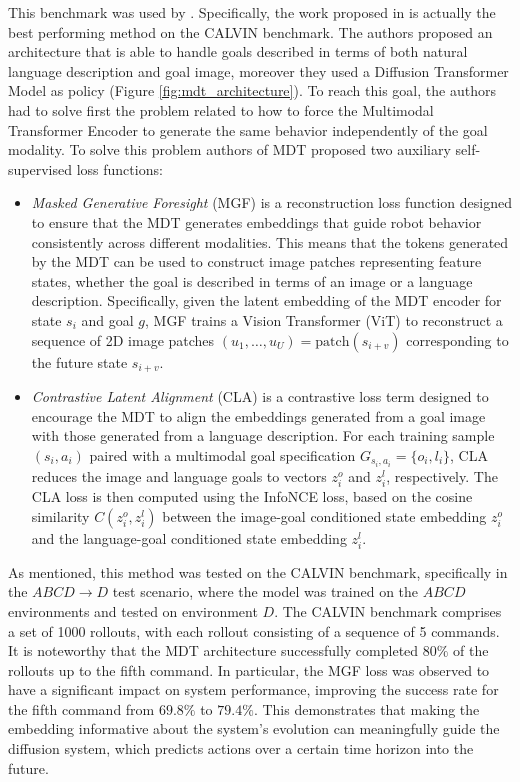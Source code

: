 This benchmark was used by \cite{mees2022hulc,mees2023hulc++,reuss2024multimodal}. Specifically, the work proposed in \cite{reuss2024multimodal} is actually the best performing method on the CALVIN benchmark. The authors proposed an architecture that is able to handle goals described in terms of both natural language description and goal image, moreover they used a Diffusion Transformer Model as policy (Figure \ref{fig:mdt_architecture}). To reach this goal, the authors had to solve first the problem related to how to force the Multimodal Transformer Encoder to generate the same behavior independently of the goal modality. To solve this problem authors of MDT proposed two auxiliary self-supervised loss functions:
\begin{itemize}
    \item \textit{Masked Generative Foresight} (MGF) is a reconstruction loss function designed to ensure that the MDT generates embeddings that guide robot behavior consistently across different modalities. This means that the tokens generated by the MDT can be used to construct image patches representing feature states, whether the goal is described in terms of an image or a language description. Specifically, given the latent embedding of the MDT encoder for state $s_i$ and goal $g$, MGF trains a Vision Transformer (ViT) to reconstruct a sequence of 2D image patches $(u_1, \dots, u_U) = \text{patch}(s_{i+v})$ corresponding to the future state $s_{i+v}$.
    \item \textit{Contrastive Latent Alignment} (CLA) is a contrastive loss term designed to encourage the MDT to align the embeddings generated from a goal image with those generated from a language description. For each training sample $(s_i, a_i)$ paired with a multimodal goal specification $G_{s_i,a_i} = \{o_i, l_i\}$, CLA reduces the image and language goals to vectors $z_i^o$ and $z_i^l$, respectively. The CLA loss is then computed using the InfoNCE loss, based on the cosine similarity $C(z_i^o, z_i^l)$ between the image-goal conditioned state embedding $z_i^o$ and the language-goal conditioned state embedding $z_i^l$.
\end{itemize}

As mentioned, this method was tested on the CALVIN benchmark, specifically in the $ABCD \rightarrow D$ test scenario, where the model was trained on the $ABCD$ environments and tested on environment $D$. The CALVIN benchmark comprises a set of 1000 rollouts, with each rollout consisting of a sequence of 5 commands. It is noteworthy that the MDT architecture successfully completed $80\%$ of the rollouts up to the fifth command. In particular, the MGF loss was observed to have a significant impact on system performance, improving the success rate for the fifth command from $69.8\%$ to $79.4\%$. This demonstrates that making the embedding informative about the system's evolution can meaningfully guide the diffusion system, which predicts actions over a certain time horizon into the future.

